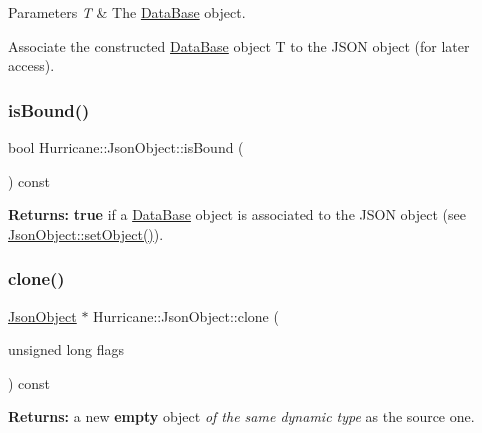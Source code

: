 \begin{DoxyParams}{Parameters}
{\em T} & The \mbox{\hyperlink{classHurricane_1_1DataBase}{Data\+Base}} object.\\
\hline
\end{DoxyParams}
Associate the constructed \mbox{\hyperlink{classHurricane_1_1DataBase}{Data\+Base}} object {\ttfamily T} to the J\+S\+ON object (for later access). \mbox{\label{classHurricane_1_1JsonObject_a4bb80844dcd175ad16cf92ee29064850}} 
\subsubsection{\texorpdfstring{is\+Bound()}{isBound()}}
{\footnotesize\ttfamily bool Hurricane\+::\+Json\+Object\+::is\+Bound (\begin{DoxyParamCaption}{ }\end{DoxyParamCaption}) const\hspace{0.3cm}{\ttfamily [inline]}}

{\bfseries Returns\+:} {\bfseries true} if a \mbox{\hyperlink{classHurricane_1_1DataBase}{Data\+Base}} object is associated to the J\+S\+ON object (see \mbox{\hyperlink{classHurricane_1_1JsonObject_aa8e23d2445b90cced19a97d50372314c}{Json\+Object\+::set\+Object()}}). \mbox{\label{classHurricane_1_1JsonObject_a939cfbae43f7b0d994648d07bdba2b32}} 
\subsubsection{\texorpdfstring{clone()}{clone()}}
{\footnotesize\ttfamily \mbox{\hyperlink{classHurricane_1_1JsonObject}{Json\+Object}} $\ast$ Hurricane\+::\+Json\+Object\+::clone (\begin{DoxyParamCaption}\item[{unsigned long}]{flags }\end{DoxyParamCaption}) const\hspace{0.3cm}{\ttfamily [pure virtual]}}

{\bfseries Returns\+:} a new {\bfseries empty} object {\itshape of the same dynamic type} as the source one.

